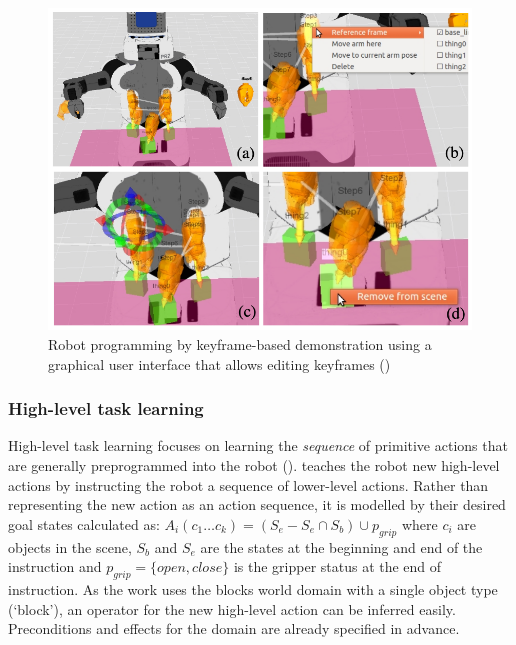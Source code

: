 \begin{figure}[!h]
	\centering
	\includegraphics[width=0.7\linewidth]{figures/alexandrova-gui}
	\caption{Robot programming by keyframe-based demonstration using a graphical user interface that allows editing keyframes (\cite{alexandrova2014robot})}
	\label{fig:alexandrova-gui}
\end{figure} 

\subsubsection{High-level task learning}\label{ssec:highlevel}
High-level task learning focuses on learning the \textit{sequence} of primitive actions that are generally preprogrammed into the robot (\cite{peppoloni2014ros}).
\cite{she2014teaching} teaches the robot new high-level actions by instructing the robot a sequence of lower-level actions.
Rather than representing the new action as an action sequence, it is modelled by their desired goal states calculated as:
$A_i(c_1 \dots c_k) = (S_e - S_e \cap S_b) \cup p_{grip}$ where $c_i$ are objects in the scene, $S_b$ and $S_e$ are the states at the beginning and end of the instruction and $p_{grip} = \{open, close\}$ is the gripper status at the end of instruction.
As the work uses the blocks world domain with a single object type (`block'), an operator for the new high-level action can be inferred easily. Preconditions and effects for the domain are already specified in advance.

